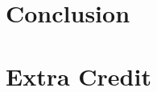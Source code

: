 \documentclass[12pt,twoside,a4paper]{article}
\begin{document}
\section{Conclusion}

\section{Extra Credit}


{\small

}
\end{document}
